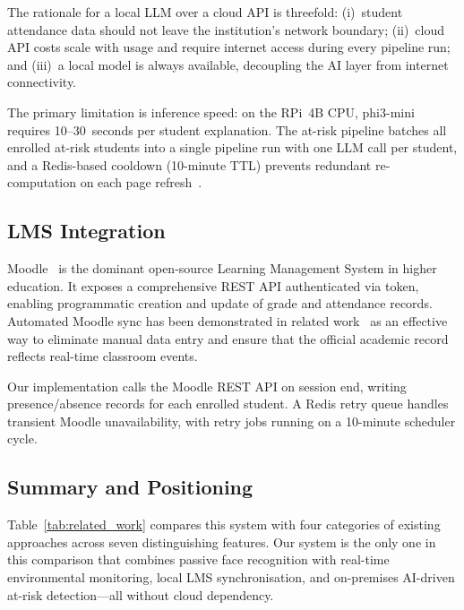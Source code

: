 The rationale for a local LLM over a cloud API is threefold: (i)~student
attendance data should not leave the institution's network boundary;
(ii)~cloud API costs scale with usage and require internet access during
every pipeline run; and (iii)~a local model is always available,
decoupling the AI layer from internet connectivity.

The primary limitation is inference speed: on the RPi~4B CPU,
phi3-mini requires 10--30~seconds per student explanation.  The
at-risk pipeline batches all enrolled at-risk students into a single
pipeline run with one LLM call per student, and a Redis-based cooldown
(10-minute TTL) prevents redundant re-computation on each page
refresh~\cite{redis_docs}.

\subsection{LMS Integration}
\label{subsec:lit_moodle}

Moodle~\cite{moodle_docs} is the dominant open-source Learning Management
System in higher education.  It exposes a comprehensive REST API
authenticated via token, enabling programmatic creation and update of
grade and attendance records.  Automated Moodle sync has been
demonstrated in related work~\cite{moodle_auto_2021} as an effective way
to eliminate manual data entry and ensure that the official academic
record reflects real-time classroom events.

Our implementation calls the Moodle REST API on session end, writing
presence/absence records for each enrolled student.  A Redis retry
queue handles transient Moodle unavailability, with retry jobs running
on a 10-minute scheduler cycle.

\subsection{Summary and Positioning}
\label{subsec:lit_summary}

Table~\ref{tab:related_work} compares this system with four categories
of existing approaches across seven distinguishing features.  Our
system is the only one in this comparison that combines passive face
recognition with real-time environmental monitoring, local LMS
synchronisation, and on-premises AI-driven at-risk detection---all
without cloud dependency.

